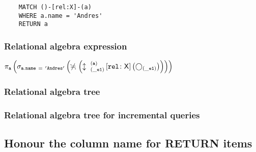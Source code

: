 	\begin{lstlisting}
	MATCH ()-[rel:X]-(a)
	WHERE a.name = 'Andres'
	RETURN a
	\end{lstlisting}


	\subsubsection*{Relational algebra expression}

	$\projection{\var{a}} \left(\selection{\mathtt{a.name~=~'Andres'}} \left(\alldifferent{} \left(\expandboth{\_e1}{a}{}{rel}{X} \left(\getvertices{\_e1}{}\right)\right)\right)\right)$

	\subsubsection*{Relational algebra tree}


	\subsubsection*{Relational algebra tree for incremental queries}

	\subsection{Honour the column name for RETURN items}

